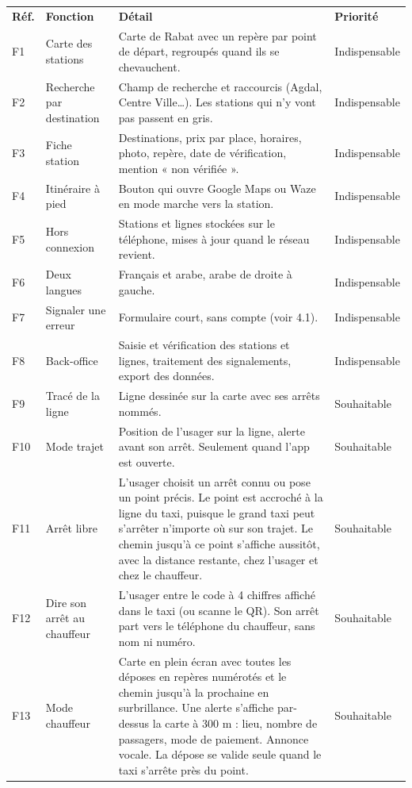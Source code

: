 \documentclass[11pt,a4paper]{article}
\newcommand{\hd}[1]{\textbf{\color{white}#1}}
\newcommand{\hdrow}{\rowcolor{brand}}
\begin{document}
\begin{xltabular}{\textwidth}{@{}l P{3.3cm} Y l@{}}
\hdrow \hd{Réf.} & \hd{Fonction} & \hd{Détail} & \hd{Priorité} \\
F1 & Carte des stations & Carte de Rabat avec un repère par point de départ, regroupés quand ils se chevauchent. & Indispensable \\
F2 & Recherche par destination & Champ de recherche et raccourcis (Agdal, Centre Ville\dots). Les stations qui n'y vont pas passent en gris. & Indispensable \\
F3 & Fiche station & Destinations, prix par place, horaires, photo, repère, date de vérification, mention « non vérifiée ». & Indispensable \\
F4 & Itinéraire à pied & Bouton qui ouvre Google Maps ou Waze en mode marche vers la station. & Indispensable \\
F5 & Hors connexion & Stations et lignes stockées sur le téléphone, mises à jour quand le réseau revient. & Indispensable \\
F6 & Deux langues & Français et arabe, arabe de droite à gauche. & Indispensable \\
F7 & Signaler une erreur & Formulaire court, sans compte (voir 4.1). & Indispensable \\
F8 & Back-office & Saisie et vérification des stations et lignes, traitement des signalements, export des données. & Indispensable \\
F9 & Tracé de la ligne & Ligne dessinée sur la carte avec ses arrêts nommés. & Souhaitable \\
F10 & Mode trajet & Position de l'usager sur la ligne, alerte avant son arrêt. Seulement quand l'app est ouverte. & Souhaitable \\
F11 & Arrêt libre & L'usager choisit un arrêt connu ou pose un point précis. Le point est accroché à la ligne du taxi, puisque le grand taxi peut s'arrêter n'importe où sur son trajet. Le chemin jusqu'à ce point s'affiche aussitôt, avec la distance restante, chez l'usager et chez le chauffeur. & Souhaitable \\
F12 & Dire son arrêt au chauffeur & L'usager entre le code à 4 chiffres affiché dans le taxi (ou scanne le QR). Son arrêt part vers le téléphone du chauffeur, sans nom ni numéro. & Souhaitable \\
F13 & Mode chauffeur & Carte en plein écran avec toutes les déposes en repères numérotés et le chemin jusqu'à la prochaine en surbrillance. Une alerte s'affiche par-dessus la carte à 300 m : lieu, nombre de passagers, mode de paiement. Annonce vocale. La dépose se valide seule quand le taxi s'arrête près du point. & Souhaitable \\

\end{xltabular}
\end{document}
